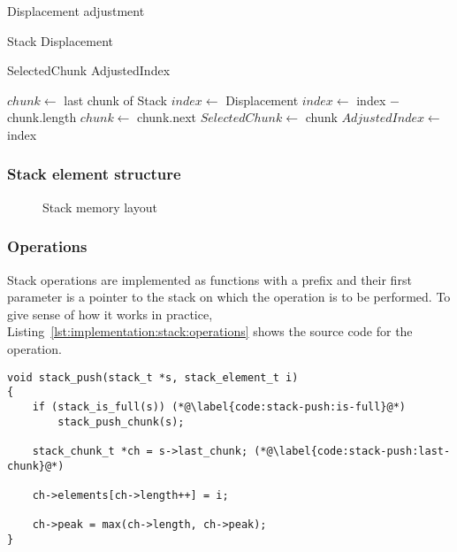 \begin{algorithm}[H]
  \caption{Displacement adjustment}
  \label{algo:implementation:stack:displacement}

  \begin{algorithmic}
    \Require Stack 
    \Require Displacement 

    \Ensure SelectedChunk 
    \Ensure AdjustedIndex 

    \State $chunk\gets$ last chunk of Stack
    \State $index\gets$ Displacement
    \State $index\gets$ index $-$ chunk.length
    \State $chunk \gets$ chunk.next
    \EndWhile
    \State $SelectedChunk\gets$ chunk
    \State $AdjustedIndex\gets$ index
    \EndProcedure
  \end{algorithmic}
\end{algorithm}


\subsubsection{Stack element structure}

\begin{figure}[H]
  \centering
  
  \caption{Stack memory layout}
\end{figure}

\subsubsection{Operations}

Stack operations are implemented as functions with a  prefix and
their first parameter is a pointer to the stack on which the operation is to be
performed. To give sense of how it works in practice,
Listing~\ref{lst:implementation:stack:operations} shows the source code for the
 operation.

\begin{minipage}{\linewidth}
\begin{lstlisting}[language={[ANSI]C},
  caption={Source code of the \code{push} stack operation},
  label={lst:implementation:stack:operations}]
void stack_push(stack_t *s, stack_element_t i)
{
    if (stack_is_full(s)) (*@\label{code:stack-push:is-full}@*)
        stack_push_chunk(s);

    stack_chunk_t *ch = s->last_chunk; (*@\label{code:stack-push:last-chunk}@*)

    ch->elements[ch->length++] = i;

    ch->peak = max(ch->length, ch->peak);
}
\end{lstlisting}
\end{minipage}

